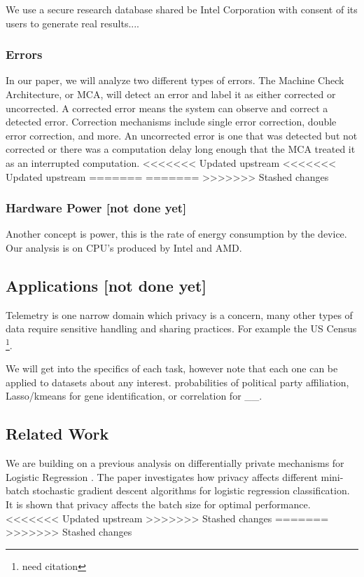 \documentclass[12pt,letterpaper]{article}
\begin{document}
\begin{table}[h]
We use a secure research database shared be Intel Corporation with consent of its users to generate real results....

\subsubsection{Errors}

In our paper, we will analyze two different types of errors. The Machine Check Architecture, or MCA, will detect an error and label it as either corrected or uncorrected. A corrected error means the system can observe and correct a detected error. Correction mechanisms include single error correction, double error correction, and more. An uncorrected error is one that was detected but not corrected or there was a computation delay long enough that the MCA treated it as an interrupted computation. \cite{Kwasnick2023}
<<<<<<< Updated upstream
<<<<<<< Updated upstream
=======
=======
>>>>>>> Stashed changes

\subsubsection{Hardware Power [not done yet]}

Another concept is power, this is the rate of energy consumption by the device. Our analysis is on CPU's produced by Intel and AMD. \cite{Kwasnick2023}

\subsection{Applications [not done yet]}

Telemetry is one narrow domain which privacy is a concern, many other types of data require sensitive handling and sharing practices. For example the US Census \footnote{need citation}. 

We will get into the specifics of each task, however note that each one can be applied to datasets about any interest. probabilities of political party affiliation, Lasso/kmeans for gene identification, or correlation for \_\_. 

\subsection{Related Work}

We are building on a previous analysis on differentially private mechanisms for Logistic Regression  \cite{qtr1proj}. The paper investigates how privacy affects different mini-batch stochastic gradient descent algorithms for logistic regression classification. It is shown that privacy affects the batch size for optimal performance.
<<<<<<< Updated upstream
>>>>>>> Stashed changes
=======
>>>>>>> Stashed changes


\end{table}
\end{document}
